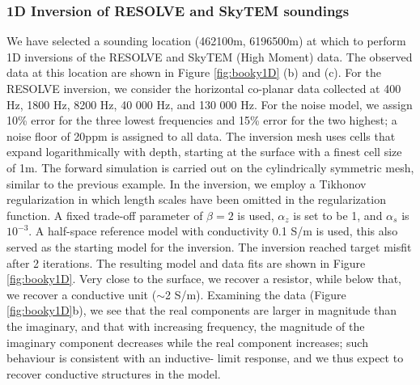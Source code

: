 \documentclass[preprint,review,3p,times,onecolumn,authoryear]{elsarticle}
\begin{document}
\subsubsection{1D Inversion of RESOLVE and SkyTEM soundings}

We have selected a sounding location (462100m, 6196500m) at which to perform
1D inversions of the RESOLVE and SkyTEM (High Moment) data. The observed data
at this location are shown in Figure \ref{fig:booky1D} (b) and (c). For the RESOLVE inversion, we
consider the horizontal co-planar data collected at 400 Hz, 1800 Hz, 8200 Hz,
40 000 Hz, and 130 000 Hz. For the noise model, we assign 10\% error for the
three lowest frequencies and 15\% error for the two highest; a noise floor of
20ppm is assigned to all data. The inversion mesh uses cells that expand
logarithmically with depth, starting at the surface with a finest cell size of 1m. The forward
simulation is carried out on the cylindrically symmetric mesh, similar to the
previous example. In the inversion, we employ a Tikhonov regularization in
which length scales have been omitted in the regularization function. A fixed
trade-off parameter of $\beta = 2$ is used, $\alpha_z$ is set to be 1, and
$\alpha_s$ is ${10^{-3}}$. A half-space reference model with conductivity 0.1
S/m is used, this also served as the starting model for the inversion. The
inversion reached target misfit after 2 iterations. The resulting model and
data fits are shown in Figure \ref{fig:booky1D}. Very close to the surface, we
recover a resistor, while below that, we recover a conductive unit ($\sim$2
S/m). Examining the data (Figure \ref{fig:booky1D}b), we see that the real
components are larger in magnitude than the imaginary, and that with
increasing frequency, the magnitude of the imaginary component decreases while
the real component increases; such behaviour is consistent with an inductive-
limit response, and we thus expect to recover conductive structures in the
model.
\end{document}
